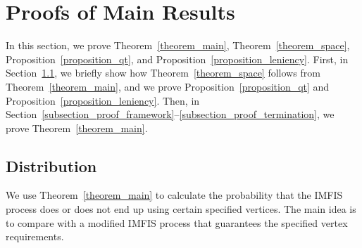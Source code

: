 \documentclass{article}
\theoremstyle{plain}
\theoremstyle{remark}
\theoremstyle{plain}
\numberwithin{equation}{section}
\begin{document}
	
	\section{Proofs of Main Results}\label{section_proof}
	
	
	In this section, we prove Theorem~\ref{theorem_main}, Theorem~\ref{theorem_space}, Proposition~\ref{proposition_qt}, and Proposition~\ref{proposition_leniency}. First, in Section~\ref{subsection_proof_distribution}, we briefly show how Theorem~\ref{theorem_space} follows from Theorem~\ref{theorem_main}, and we prove Proposition~\ref{proposition_qt} and Proposition~\ref{proposition_leniency}. Then, in Section~\ref{subsection_proof_framework}--\ref{subsection_proof_termination}, we prove Theorem~\ref{theorem_main}.
	
	\subsection{Distribution}\label{subsection_proof_distribution}
	
	We use Theorem~\ref{theorem_main} to calculate the probability that the IMFIS process does or does not end up using certain specified vertices. The main idea is to compare with a modified IMFIS process that guarantees the specified vertex requirements.
	
\end{document}
